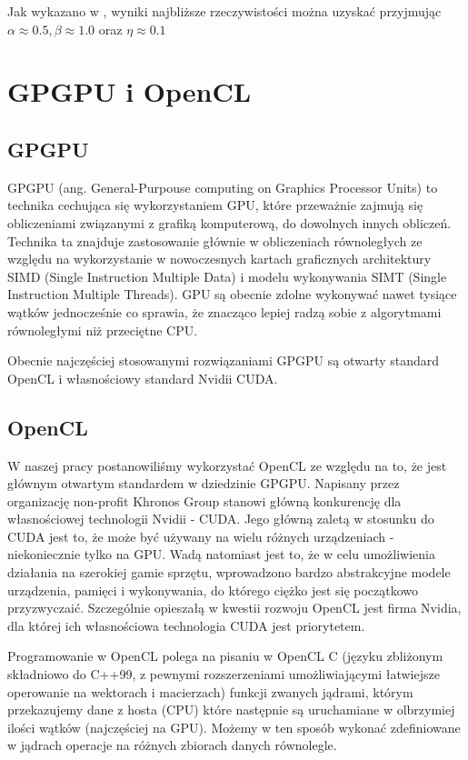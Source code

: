 \documentclass[polish, 12pt]{aghthesis}
\begin{document}
			Jak wykazano w \cite{Lombardi}, wyniki najbliższe rzeczywistości można uzyskać przyjmując $\alpha \approx 0.5, \beta \approx 1.0$ oraz $\eta \approx 0.1$
	
	\section{GPGPU i OpenCL}
		
		\subsection{GPGPU}
			GPGPU (ang. General-Purpouse computing on Graphics Processor Units) to technika cechująca się wykorzystaniem GPU, które przeważnie zajmują się obliczeniami związanymi z grafiką komputerową, do dowolnych innych obliczeń. Technika ta znajduje zastosowanie głównie w obliczeniach równoległych ze względu na wykorzystanie w nowoczesnych kartach graficznych architektury SIMD (Single Instruction Multiple Data) i modelu wykonywania SIMT (Single Instruction Multiple Threads). GPU są obecnie zdolne wykonywać nawet tysiące wątków jednocześnie co sprawia, że znacząco lepiej radzą sobie z algorytmami równoległymi niż przeciętne CPU. 
			

			Obecnie najczęściej stosowanymi rozwiązaniami GPGPU są otwarty standard OpenCL i własnościowy standard Nvidii CUDA.
		
		\subsection{OpenCL}
			W naszej pracy postanowiliśmy wykorzystać OpenCL ze względu na to, że jest głównym otwartym standardem w dziedzinie GPGPU. Napisany przez organizację non-profit Khronos Group stanowi główną konkurencję dla własnościowej technologii Nvidii - CUDA. Jego główną zaletą w stosunku do CUDA jest to, że może być używany na wielu różnych urządzeniach - niekoniecznie tylko na GPU. Wadą natomiast jest to, że w celu umożliwienia działania na szerokiej gamie sprzętu, wprowadzono bardzo abstrakcyjne modele urządzenia, pamięci i wykonywania, do którego ciężko jest się początkowo przyzwyczaić. Szczególnie opieszałą w kwestii rozwoju OpenCL jest firma Nvidia, dla której ich własnościowa technologia CUDA jest priorytetem.	

			Programowanie w OpenCL polega na pisaniu w OpenCL C (języku zbliżonym składniowo do C++99, z pewnymi rozszerzeniami umożliwiającymi łatwiejsze operowanie na wektorach i macierzach) funkcji zwanych jądrami, którym przekazujemy dane z hosta (CPU) które następnie są uruchamiane w olbrzymiej ilości wątków (najczęściej na GPU). Możemy w ten sposób wykonać zdefiniowane w jądrach operacje na różnych zbiorach danych równolegle. 
			
\end{document}
